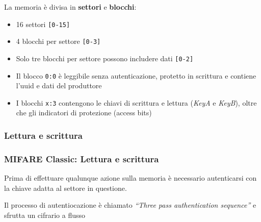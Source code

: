 \begin{frame}
    La memoria è divisa in \textbf{settori} e \textbf{blocchi}:
    \begin{itemize}
        \item <1-> 16 settori \texttt{[0-15]}
        \item <2-> 4 blocchi per settore \texttt{[0-3]}
        \item <2-> Solo tre blocchi per settore possono includere dati \texttt{[0-2]}
        \item <3-> Il blocco \texttt{0:0} è leggibile senza autenticazione, protetto in scrittura e contiene l'uuid e dati del produttore
        \item <4-> I blocchi \texttt{x:3} contengono le chiavi di scrittura e lettura (\textit{KeyA} e \textit{KeyB}), oltre che gli indicatori di protezione (access bits)
    \end{itemize}
\end{frame}

\subsubsection{Lettura e scrittura}
\begin{frame}
    \frametitle{MIFARE Classic: Lettura e scrittura}
    Prima di effettuare qualunque azione sulla memoria è necessario autenticarsi con la chiave adatta al settore in questione.\pause

    Il processo di autentiocazione è chiamato \textit{``Three pass authentication sequence''}\cite{nxpmifareev1datasheet}
    e sfrutta un cifrario a flusso
\end{frame}


